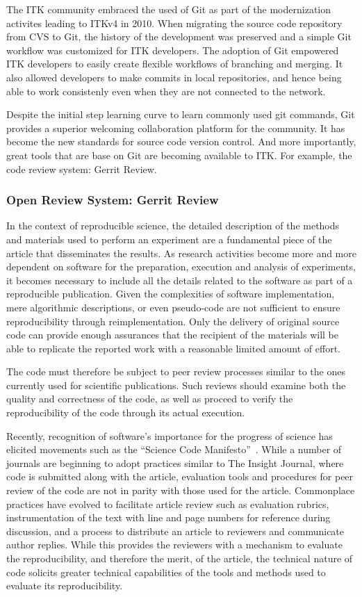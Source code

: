 \documentclass{frontiersENG} %
\begin{document}
The ITK community embraced the used of Git as part of the modernization activites
leading to ITKv4 in 2010.  When migrating the source code repository from CVS
to Git, the history of the development was preserved and a simple Git workflow
was customized for ITK developers.  The adoption of Git empowered ITK
developers to easily create flexible workflows of branching and merging. It
also allowed developers to make commits in local repositories, and hence being
able to work consistenly even when they are not connected to the network.

Despite the initial step learning curve to learn commonly used git commands,
Git provides a superior welcoming collaboration platform for the community. It
has become the new standards for source code version control.  And more
importantly, great tools that are base on Git are becoming available to ITK.
For example, the code review system: Gerrit Review.

\subsubsection{Open Review System: Gerrit Review} In the context of
reproducible science, the detailed description of the methods and materials
used to perform an experiment are a fundamental piece of the article that
disseminates the results. As research activities become more and more dependent
on software for the preparation, execution and analysis of experiments, it
becomes necessary to include all the details related to the software as part of
a reproducible publication. Given the complexities of software implementation,
mere algorithmic descriptions, or even pseudo-code are not sufficient to ensure
reproducibility through reimplementation. Only the delivery of original source
code can provide enough assurances that the recipient of the materials will be
able to replicate the reported work with a reasonable limited amount of effort.

The code must therefore be subject to peer review processes similar to the ones
currently used for scientific publications. Such reviews should examine both
the quality and correctness of the code, as well as proceed to verify the
reproducibility of the code through its actual execution.

Recently, recognition of software's importance for the progress of science has
elicited movements such as the ``Science Code Manifesto''~\cite{Barnes2011}.
While a number of journals are beginning to adopt practices similar to The
Insight Journal, where code is submitted along with the article, evaluation
tools and procedures for peer review of the code are not in parity with those
used for the article. Commonplace practices have evolved to facilitate article
review such as evaluation rubrics, instrumentation of the text with line and
page numbers for reference during discussion, and a process to distribute an
article to reviewers and communicate author replies.  While this provides the
reviewers with a mechanism to evaluate the reproducibility, and therefore the
merit, of the article, the technical nature of code solicits greater technical
capabilities of the tools and methods used to evaluate its reproducibility.
\end{document}
